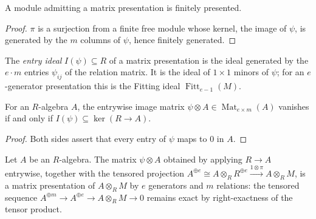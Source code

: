 \begin{lemma}
  \label{lem:matrix_presentation_fp}
  \leanok
  A module admitting a matrix presentation is finitely presented.
\end{lemma}

\begin{proof}
  \leanok
  \(\pi\) is a surjection from a finite free module whose kernel, the image
  of \(\psi\), is generated by the \(m\) columns of \(\psi\), hence finitely
  generated.
\end{proof}

\begin{definition}
  \label{def:entry_ideal}
  \leanok
  The \emph{entry ideal} \(I(\psi) \subseteq R\) of a matrix presentation is
  the ideal generated by the \(e \cdot m\) entries \(\psi_{ij}\) of the
  relation matrix.  It is the ideal of \(1 \times 1\) minors of \(\psi\);
  for an \(e\)-generator presentation this is the Fitting ideal
  \(\operatorname{Fitt}_{e-1}(M)\).
\end{definition}

\begin{lemma}
  \label{lem:entry_ideal_vanish}
  \leanok
  For an \(R\)-algebra \(A\), the entrywise image matrix
  \(\psi \otimes A \in \operatorname{Mat}_{e \times m}(A)\) vanishes if and
  only if \(I(\psi) \subseteq \ker(R \to A)\).
\end{lemma}

\begin{proof}
  \leanok
  Both sides assert that every entry of \(\psi\) maps to \(0\) in \(A\).
\end{proof}

\begin{definition}
  \label{def:matrix_presentation_base_change}
  \leanok
  Let \(A\) be an \(R\)-algebra.  The matrix \(\psi \otimes A\) obtained by
  applying \(R \to A\) entrywise, together with the tensored projection
  \(A^{\oplus e} \cong A \otimes_R R^{\oplus e}
    \xrightarrow{1 \otimes \pi} A \otimes_R M\),
  is a matrix presentation of \(A \otimes_R M\) by \(e\) generators and
  \(m\) relations: the tensored sequence
  \(A^{\oplus m} \to A^{\oplus e} \to A \otimes_R M \to 0\) remains exact by
  right-exactness of the tensor product.
\end{definition}

